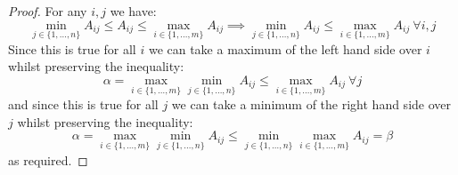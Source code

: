 \documentclass[../main.tex]{subfiles}
\begin{document}
\begin{proof}
  \nonexaminable
  For any $i, j$  we have:
  \[
    \min_{j \in \{1, \ldots, n\}} A_{i j} \leq A_{i j} \leq \max_{i \in \{1, \ldots, m\}} A_{i j} \implies \min_{j \in \{1, \ldots, n\}} A_{i j} \leq \max_{i \in \{1, \ldots, m\}} A_{i j}\ \forall i, j
  \]
  Since this is true for all $i$ we can take a maximum of the left hand side over $i$ whilst preserving the inequality:
  \[
    \alpha = \max_{i \in \{1, \ldots, m\}} \min_{j \in \{1, \ldots, n\}} A_{i j} \leq \max_{i \in \{1, \ldots, m\}} A_{i j}\ \forall j
  \]
  and since this is true for all $j$ we can take a minimum of the right hand side over $j$ whilst preserving the inequality:
  \[
    \alpha = \max_{i \in \{1, \ldots, m\}} \min_{j \in \{1, \ldots, n\}} A_{i j} \leq \min_{j \in \{1, \ldots, n\}}  \max_{i \in \{1, \ldots, m\}} A_{i j} = \beta
  \]
  as required.
\end{proof}
\end{document}
